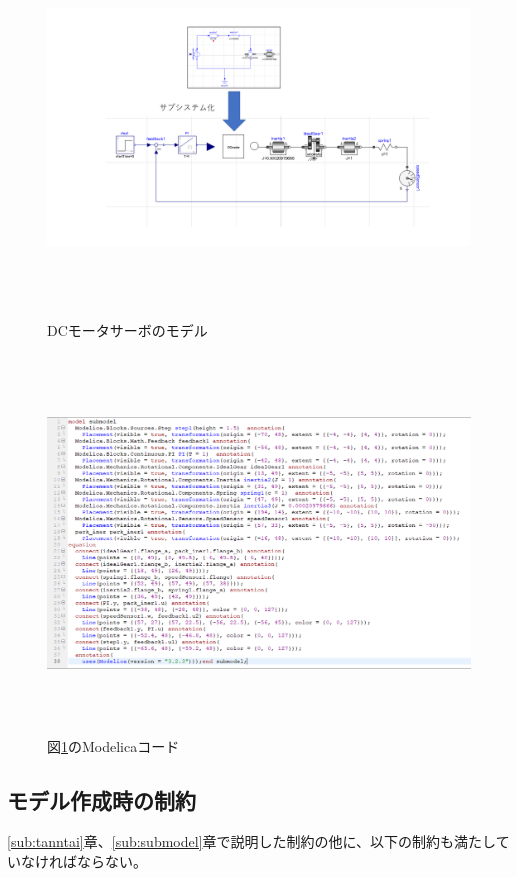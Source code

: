 \begin{figure}[t]
	\centering
	\includegraphics[width=16.5cm,height=10cm]{./Image/submodel_pack.png}
	\caption{DCモータサーボのモデル}
	\label{fig:submodel}
  \end{figure}

  \begin{figure}[t]
	\centering
	\includegraphics[width=16.5cm,height=10cm]{./Image/sub_modelica.png}
	\caption{図\ref{fig:submodel}のModelicaコード}
	\label{fig:sub_modelica}
  \end{figure}

  \subsection{モデル作成時の制約}\label{sub:seiyaku}
  \ref{sub:tanntai}章、\ref{sub:submodel}章で説明した制約の他に、以下の制約も満たしていなければならない。

